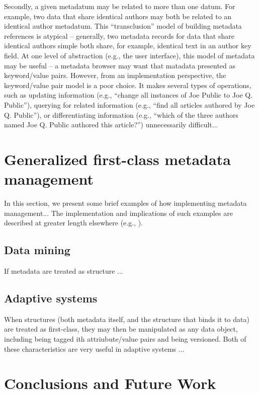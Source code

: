 \documentclass[10pt, a4paper, oneside]{article}
\begin{document}
Secondly, a given metadatum may be related to more than one datum.
For example, two data that share identical authors may both be related
to an identical author metadatum.  This ``transclusion'' \cite{nelson}
model of building metadata references is atypical -- generally, two
metadata records for data that share identical authors simple both
share, for example, identical text in an author key field.  At one
level of abstraction (e.g., the user interface), this model of
metadata may be useful -- a metadata browser may want that matadata
presented as keyword/value pairs.  However, from an implementation
perspective, the keyword/value pair model is a poor choice.  It makes
several types of operations, such as updating information (e.g.,
``change all instances of Joe Public to Joe
Q. Public''), querying for related information (e.g., ``find all
articles authored by Joe Q. Public''), or differentiating
information (e.g., ``which of the three authors named Joe
Q. Public authored this article?'')  unnecessarily difficult...  

\section{Generalized first-class metadata management}

In this section, we present some brief examples of how implementing
metadata management... The implementation and implications of such
examples are described at greater length elsewhere (e.g.,
\cite{tois-ver, hoss}).

\subsection{Data mining}

If metadata are treated as structure ...

\subsection{Adaptive systems}

When structures (both metadata itself, and the structure that binds it
to data) are treated as first-class, they may then be manipulated as
any data object, including being tagged ith attriubute/value pairs and
being versioned.  Both of these characteristics are very useful in
adaptive systems \cite{adapt}...



\section{Conclusions and Future Work}
\end{document}
